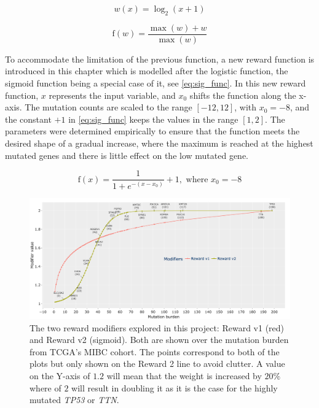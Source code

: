 \begin{equation} \label{eq:n_II:w}
    w(x) = \log_2(x+1)
\end{equation}

\begin{equation} \label{eq:n_II:norm3_func}
\text{f}(w) = \frac{\max(w) + w}{\max(w)}
\end{equation}

To accommodate the limitation of the previous function, a new reward function is introduced in this chapter which is modelled after the logistic function, the sigmoid function being a special case of it, see \cref{eq:sig_func}. In this new reward function, $x$ represents the input variable, and $x_0$ shifts the function along the x-axis. The mutation counts are scaled to the range $[-12, 12]$, with $x_0 = -8$, and the constant $+1$ in \cref{eq:sig_func} keeps the values in the range $[1, 2]$. The parameters were determined empirically to ensure that the function meets the desired shape of a gradual increase, where the maximum is reached at the highest mutated genes and there is little effect on the low mutated gene.

\begin{equation} \label{eq:sig_func}
\text{f}(x) =  \frac{1}{1 + e^{-(x - x_0)}} + 1, \text{ where } x_0=-8
\end{equation}


\begin{figure}[!b]    
    \centering
    \includegraphics[width=1.0\textwidth,height=1.0\textheight,keepaspectratio]{Sections/Network_II/validation/reward_modifiers.png}
    \caption[Influences of edges weight by Reward v1 and v2 modifiers ]{The two reward modifiers explored in this project: Reward v1 (red) and Reward v2 (sigmoid). Both are shown over the mutation burden from TCGA's MIBC cohort. The points correspond to both of the plots but only shown on the Reward 2 line to avoid clutter. A value on the Y-axis of $1.2$ will mean that the weight is increased by $20\%$ where of $2$ will result in doubling it as it is the case for the highly mutated \textit{TP53} or \textit{TTN}. }
    \label{fig:N_II:modifiers_comp}
\end{figure}


